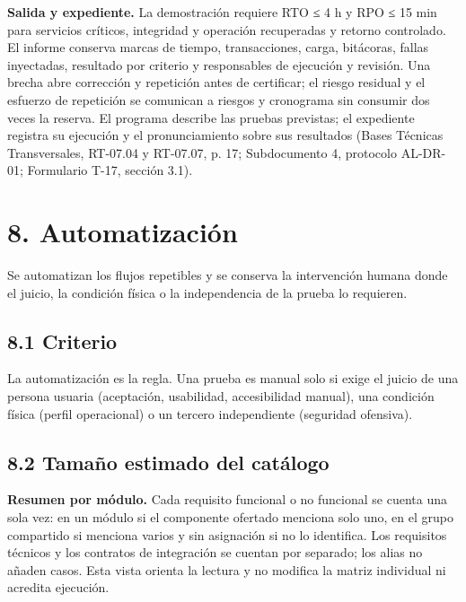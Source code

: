 \textbf{Salida y expediente.} La demostración requiere RTO ≤ 4 h y RPO ≤ 15 min para servicios críticos, integridad y operación recuperadas y retorno controlado. El informe conserva marcas de tiempo, transacciones, carga, bitácoras, fallas inyectadas, resultado por criterio y responsables de ejecución y revisión. Una brecha abre corrección y repetición antes de certificar; el riesgo residual y el esfuerzo de repetición se comunican a riesgos y cronograma sin consumir dos veces la reserva. El programa describe las pruebas previstas; el expediente registra su ejecución y el pronunciamiento sobre sus resultados (Bases Técnicas Transversales, RT-07.04 y RT-07.07, p. 17; Subdocumento 4, protocolo AL-DR-01; Formulario T-17, sección 3.1).

\section*{8. Automatización}

Se automatizan los flujos repetibles y se conserva la intervención humana donde el juicio, la condición física o la independencia de la prueba lo requieren.

\subsection*{8.1 Criterio}

La automatización es la regla. Una prueba es manual solo si exige el juicio de una persona usuaria (aceptación, usabilidad, accesibilidad manual), una condición física (perfil operacional) o un tercero independiente (seguridad ofensiva).

\subsection*{8.2 Tamaño estimado del catálogo}

\textbf{Resumen por módulo.} Cada requisito funcional o no funcional se cuenta una sola vez: en un módulo si el componente ofertado menciona solo uno, en el grupo compartido si menciona varios y sin asignación si no lo identifica. Los requisitos técnicos y los contratos de integración se cuentan por separado; los alias no añaden casos. Esta vista orienta la lectura y no modifica la matriz individual ni acredita ejecución.



